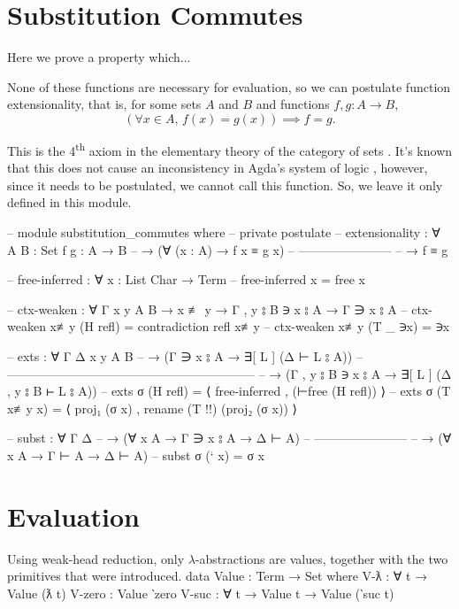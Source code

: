 \documentclass[logo,bsc,singlespacing,parskip,online]{infthesis}
\renewenvironment{code}{\mintedcopy[breaklines,breaksymbolleft=\;]{agda}}{\endmintedcopy}
\begin{document}
\section{Substitution Commutes}
Here we prove a property which...

None of these functions are necessary for evaluation, so we can postulate function extensionality,
that is, for some sets $A$ and $B$ and functions $f, g \colon A \to B$, 
\begin{equation*}
  (\forall x \in A, \, f(x) = g(x)) \implies f = g.
\end{equation*}

This is the 4\textsuperscript{th} axiom in the elementary
theory of the category of sets \citep{tom_leinster_rethinking_2014}. It's known that this does not
cause an inconsistency in Agda's system of logic \citep{wadler_programming_2022}, however, since it
needs to be postulated, we cannot call this function. So, we leave it only defined in this module.

\begin{code}
  -- module substitution_commutes where
  --   private postulate
  --     extensionality : ∀ {A B : Set} {f g : A → B}
  --       → (∀ (x : A) → f x ≡ g x)
  --         -----------------------
  --       → f ≡ g

  --   free-inferred : ∀ {x : List Char} → Term
  --   free-inferred {x} = free x

  --   ctx-weaken : ∀ {Γ x y A B} → x ≢ y → Γ , y ⦂ B ∋ x ⦂ A → Γ ∋ x ⦂ A
  --   ctx-weaken x≢y (H refl) = contradiction refl x≢y
  --   ctx-weaken x≢y (T _ ∋x) = ∋x

  --   exts : ∀ {Γ Δ x y A B}
  --     → (Γ ∋ x ⦂ A        → ∃[ L ]        (Δ ⊢ L ⦂ A))
  --       ------------------------------------------------------------
  --     → (Γ , y ⦂ B ∋ x ⦂ A → ∃[ L ] (Δ , y ⦂ B ⊢ L ⦂ A))
  --   exts σ (H refl) = ⟨ free-inferred , (⊢free (H refl)) ⟩
  --   exts σ (T x≢y x) = ⟨ proj₁ (σ x) , rename (T {!!}) (proj₂ (σ x)) ⟩

    -- subst : ∀ {Γ Δ}
    --   → (∀ {x A} → Γ ∋ x ⦂ A → Δ ⊢ A)
    --     -----------------------
    --   → (∀ {x A} → Γ ⊢ A → Δ ⊢ A)
    -- subst σ (` x)          =  σ x
\end{code}

\section{Evaluation}
Using weak-head reduction, only $\lambda$-abstractions are values, together with the two primitives
that were introduced.
\begin{code}
  data Value : Term → Set where
    V-ƛ : ∀ {t} → Value (ƛ t)
    V-zero : Value ‵zero
    V-suc : ∀ {t} → Value t → Value (‵suc t)
\end{code}
\end{document}
